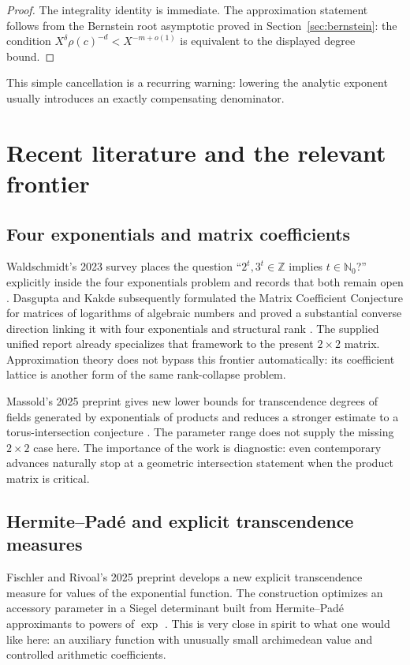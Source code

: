 \documentclass[11pt,oneside]{article}
\theoremstyle{definition}
\theoremstyle{remark}
\newcommand{\Nzero}{\mathbb N_0}
\newcommand{\Z}{\mathbb Z}
\begin{document}
\begin{proof}
The integrality identity is immediate.  The approximation statement follows from the
Bernstein root asymptotic proved in Section~\ref{sec:bernstein}: the condition
$X^\delta\rho(c)^{-d}<X^{-m+o(1)}$ is equivalent to the displayed degree bound.
\end{proof}

This simple cancellation is a recurring warning: lowering the analytic exponent usually
introduces an exactly compensating denominator.

\section{Recent literature and the relevant frontier}
\label{sec:literature}

\subsection{Four exponentials and matrix coefficients}

Waldschmidt's 2023 survey places the question ``$2^t,3^t\in\Z$ implies $t\in\Nzero$?''
explicitly inside the four exponentials problem and records that both remain open
\cite{Waldschmidt2023}.  Dasgupta and Kakde subsequently formulated the Matrix Coefficient
Conjecture for matrices of logarithms of algebraic numbers and proved a substantial converse
direction linking it with four exponentials and structural rank
\cite{DasguptaKakde2024,DasguptaKakde2026}.  The supplied unified report already specializes
that framework to the present $2\times2$ matrix.  Approximation theory does not bypass this
frontier automatically: its coefficient lattice is another form of the same rank-collapse
problem.

Massold's 2025 preprint gives new lower bounds for transcendence degrees of fields generated
by exponentials of products and reduces a stronger estimate to a torus-intersection
conjecture \cite{Massold2025}.  The parameter range does not supply the missing $2\times2$
case here.  The importance of the work is diagnostic: even contemporary advances naturally
stop at a geometric intersection statement when the product matrix is critical.

\subsection{Hermite--Pad\'e and explicit transcendence measures}

Fischler and Rivoal's 2025 preprint develops a new explicit transcendence measure for values
of the exponential function.  The construction optimizes an accessory parameter in a Siegel
determinant built from Hermite--Pad\'e approximants to powers of $\exp$
\cite{FischlerRivoal2025}.  This is very close in spirit to what one would like here: an
auxiliary function with unusually small archimedean value and controlled arithmetic
coefficients.
\end{document}
